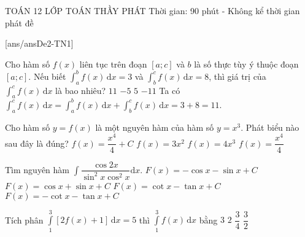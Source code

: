 ﻿\begin{name}
	{\tenchude}
	{TOÁN 12}
	{LỚP TOÁN THẦY PHÁT}
	{Thời gian: 90 phút - Không kể thời gian phát đề}
\end{name}
[ans/ansDe2-TN1]
\begin{ex}%
Cho hàm số $f(x)$ liên tục trên đoạn $[a;c]$ và $b$ là số thực tùy ý thuộc đoạn $[a;c]$. Nếu biết $\displaystyle\int_a^b f(x) \mathrm{\,d}x = 3$ và $\displaystyle\int_b^c f(x) \mathrm{\,d}x = 8$, thì giá trị của $\displaystyle\int_a^c f(x) \mathrm{\,d}x$ là bao nhiêu?
\choice
{\True $11$}
{$-5$}
{$5$}
{$-11$}
\loigiai
{
Ta có $\displaystyle\int_a^c f(x) \mathrm{\,d}x = \displaystyle\int_a^b f(x) \mathrm{\,d}x + \displaystyle\int_b^c f(x) \mathrm{\,d}x = 3 + 8 = 11$.
}
\end{ex}

\begin{ex}%
Cho hàm số $y = f(x)$ là một nguyên hàm của hàm số $y = x^3$. Phát biểu nào sau đây là đúng?
\choice
{$f(x) = \dfrac{x^4}{4} + C$}
{$f(x) = 3x^2$}
{$f(x) = 4x^3$}
{\True $f(x) = \dfrac{x^4}{4}$}
\end{ex}

\begin{ex}%
Tìm nguyên hàm $\displaystyle\int \dfrac{\cos 2x}{\sin^2 x \cos^2 x} \mathrm{d}x$.
\choice
{ $F(x) = -\cos x - \sin x + C$ }
{ $F(x) = \cos x + \sin x + C$ }
{ $F(x) = \cot x - \tan x + C$ }
{\True $F(x) = -\cot x - \tan x + C$ }
\end{ex}

\begin{ex}%
Tích phân $\displaystyle\int\limits_{1}^{3}\left[2f(x)+1\right]\mathrm{\,d}x=5$ thì $\displaystyle\int\limits_{1}^{3} f(x)\mathrm{\,d}x$ bằng
\choice
{$3$}
{$2$}
{$\dfrac{3}{4}$}
{\True$\dfrac{3}{2}$}
\end{ex}

